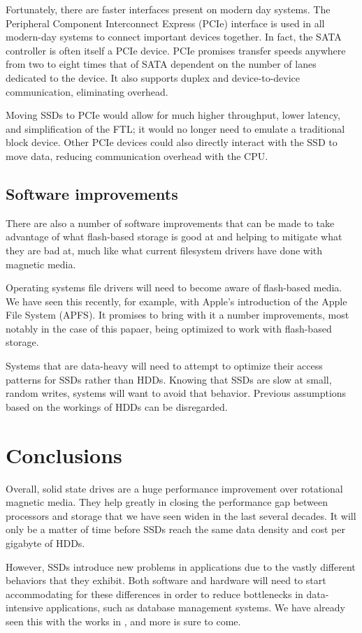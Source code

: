 \documentclass[format=acmsmall, review=false, screen=true]{acmart}
\begin{document}
Fortunately, there are faster interfaces present on modern day systems. The Peripheral Component Interconnect Express 
(PCIe) interface is used in all modern-day systems to connect important devices together. In fact, the SATA controller 
is often itself a PCIe device. PCIe promises transfer speeds anywhere from two to eight times that of SATA dependent on 
the number of lanes dedicated to the device. It also supports duplex and device-to-device communication, eliminating 
overhead. \cite{Micheloni2013}

Moving SSDs to PCIe would allow for much higher throughput, lower latency, and simplification of the FTL; it would no 
longer need to emulate a traditional block device. Other PCIe devices could also directly interact with the SSD to move 
data, reducing communication overhead with the CPU. \cite{Micheloni2013}

\subsection{Software improvements}

There are also a number of software improvements that can be made to take advantage of what flash-based storage is good 
at and helping to mitigate what they are bad at, much like what current filesystem drivers have done with magnetic media.

Operating systems file drivers will need to become aware of flash-based media. We have seen this recently, for example, 
with Apple's introduction of the Apple File System (APFS). It promises to bring with it a number improvements, most notably
in the case of this papaer, being optimized to work with flash-based storage. \cite{AppleComputer2017}

Systems that are data-heavy will need to attempt to optimize their access patterns for SSDs rather than HDDs. Knowing that 
SSDs are slow at small, random writes, systems will want to avoid that behavior. Previous assumptions based on the workings 
of HDDs can be disregarded. 

\section{Conclusions}

Overall, solid state drives are a huge performance improvement over rotational magnetic media. They help greatly in closing 
the performance gap between processors and storage that we have seen widen in the last several decades. It will only be a 
matter of time before SSDs reach the same data density and cost per gigabyte of HDDs. \cite{Chen2016}

However, SSDs introduce new problems in applications due to the vastly different behaviors that they exhibit. Both software 
and hardware will need to start accommodating for these differences in order to reduce bottlenecks in data-intensive 
applications, such as database management systems. We have already seen this with the works in \cite{AppleComputer2017}, 
and more is sure to come.



\end{document}
